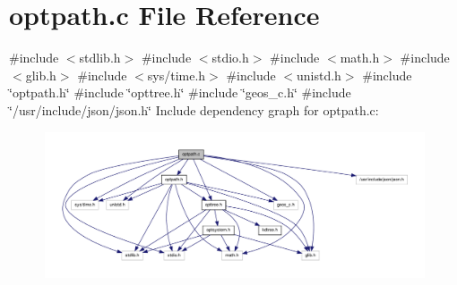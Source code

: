 \hypertarget{a00015}{\section{optpath.\-c \-File \-Reference}
\label{dd/d1b/a00015}
}
{\ttfamily \#include $<$stdlib.\-h$>$}\*
{\ttfamily \#include $<$stdio.\-h$>$}\*
{\ttfamily \#include $<$math.\-h$>$}\*
{\ttfamily \#include $<$glib.\-h$>$}\*
{\ttfamily \#include $<$sys/time.\-h$>$}\*
{\ttfamily \#include $<$unistd.\-h$>$}\*
{\ttfamily \#include \char`\"{}optpath.\-h\char`\"{}}\*
{\ttfamily \#include \char`\"{}opttree.\-h\char`\"{}}\*
{\ttfamily \#include \char`\"{}geos\-\_\-c.\-h\char`\"{}}\*
{\ttfamily \#include \char`\"{}/usr/include/json/json.\-h\char`\"{}}\*
\-Include dependency graph for optpath.\-c\-:
\nopagebreak
\begin{figure}[H]
\begin{center}
\leavevmode
\includegraphics[width=350pt]{d3/dfe/a00025}
\end{center}
\end{figure}
